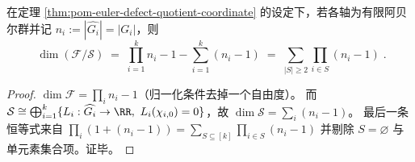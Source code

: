 \begin{corollary}\label{cor:pom-euler-defect-dimension-formula}
在定理 \ref{thm:pom-euler-defect-quotient-coordinate} 的设定下，若各轴为有限阿贝尔群并记
\(
n_i:=|\widehat{G_i}|=|G_i|
\)，则
\[
\boxed{\;
\dim(\mathcal{F}/\mathcal{S})
\;=\;
\prod_{i=1}^k n_i - 1 - \sum_{i=1}^k (n_i-1)
\;=\;
\sum_{|S|\ge 2}\prod_{i\in S}(n_i-1)\; }.
\]
\end{corollary}
\begin{proof}
\(\dim\mathcal{F}=\prod_i n_i-1\)（归一化条件去掉一个自由度）。
而 \(\mathcal{S}\cong\bigoplus_{i=1}^k\{L_i:\widehat{G_i}\to\RR,\ L_i(\chi_{i,0})=0\}\)，故
\(\dim\mathcal{S}=\sum_i(n_i-1)\)。
最后一条恒等式来自
\(
\prod_i(1+(n_i-1))=\sum_{S\subseteq[k]}\prod_{i\in S}(n_i-1)
\)
并剔除 \(S=\varnothing\) 与单元素集合项。证毕。
\end{proof}

